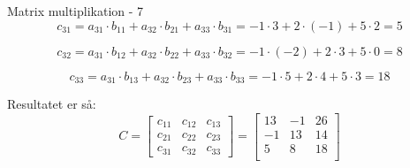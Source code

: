 \documentclass{article}
\begin{document}
\begin{exercise}{Matrix multiplikation - 7}
\hint
\[
c_{31} = a_{31} \cdot b_{11} + a_{32} \cdot b_{21} + a_{33} \cdot b_{31} = -1 \cdot 3 + 2 \cdot (-1) + 5 \cdot 2 = 5
\]

\hint
\[
c_{32} = a_{31} \cdot b_{12} + a_{32} \cdot b_{22} + a_{33} \cdot b_{32} = -1 \cdot (-2) + 2 \cdot 3 + 5 \cdot 0 = 8
\]

\hint
\[
c_{33} = a_{31} \cdot b_{13} + a_{32} \cdot b_{23} + a_{33} \cdot b_{33} = -1 \cdot 5 + 2 \cdot 4 + 5 \cdot 3= 18
\]



\hint
Resultatet er så:
\[
C = \left[\begin{array}{rrr}
c_{11} & c_{12} & c_{13} \\
c_{21} & c_{22} & c_{23} \\
c_{31} & c_{32} & c_{33}
\end{array} \right] =
\left[\begin{array}{rrr}
13 & -1 & 26 \\
-1 & 13 & 14 \\
5 & 8 & 18 \\
\end{array} \right]
\]


\end{exercise}

\newpage
\end{document}
